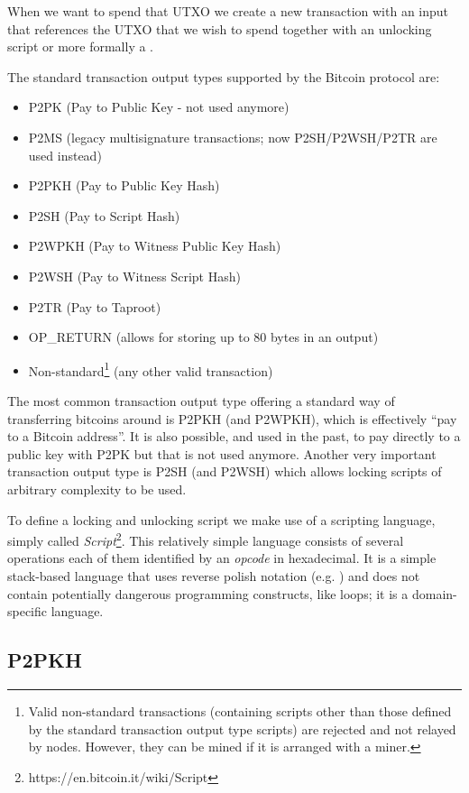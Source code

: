 When we want to spend that UTXO we create a new transaction with an input that references the UTXO that we wish to spend together with an unlocking script or more formally a .

The standard transaction output types supported by the Bitcoin protocol are:

\begin{itemize}
\item P2PK (Pay to Public Key - not used anymore)
\item P2MS (legacy multisignature transactions; now P2SH/P2WSH/P2TR are used instead)
\item P2PKH (Pay to Public Key Hash)
\item P2SH (Pay to Script Hash)
\item P2WPKH (Pay to Witness Public Key Hash)
\item P2WSH (Pay to Witness Script Hash)
\item P2TR (Pay to Taproot)
\item OP\_RETURN (allows for storing up to 80 bytes in an output)
\item Non-standard\footnote{Valid non-standard transactions (containing scripts other than those defined by the standard transaction output type scripts) are rejected and not relayed by nodes. However, they can be mined if it is arranged with a miner.} (any other valid transaction)
\end{itemize}

The most common transaction output type offering a standard way of transferring bitcoins around is P2PKH (and P2WPKH), which is effectively ``pay to a Bitcoin address''. It is also possible, and used in the past, to pay directly to a public key with P2PK but that is not used anymore. Another very important transaction output type is P2SH (and P2WSH) which allows locking scripts of arbitrary complexity to be used.

To define a locking and unlocking script we make use of a scripting language, simply called \emph{Script}\footnote{https://en.bitcoin.it/wiki/Script}. This relatively simple language consists of several operations each of them identified by an \emph{opcode} in hexadecimal. It is a simple stack-based language that uses reverse polish notation (e.g. ) and does not contain potentially dangerous programming constructs, like loops; it is a domain-specific language.

\subsection*{P2PKH}

